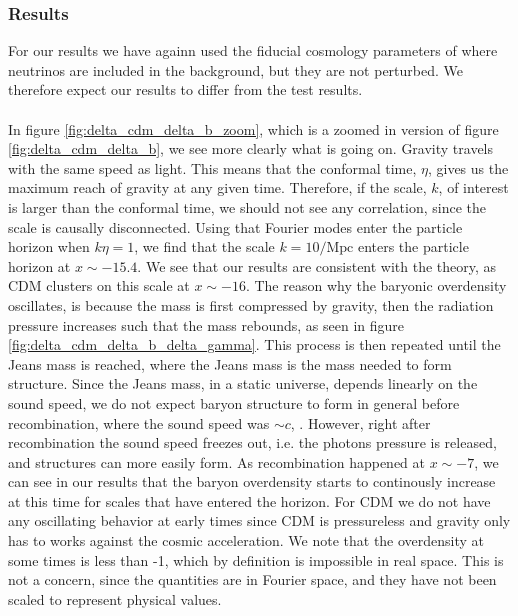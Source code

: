 \documentclass{aa}
\begin{document}
\subsubsection{Results}
For our results we have againn used the fiducial cosmology parameters of \cite{winther:2023} where neutrinos are included in the background, but they are not perturbed. We therefore expect our results to differ from the test results.\\
\\
In figure \ref{fig:delta_cdm_delta_b_zoom}, which is a zoomed in version of figure \ref{fig:delta_cdm_delta_b}, we see more clearly what is going on. Gravity travels with the same speed as light. This means that the conformal time, $\eta$,
gives us the maximum reach of gravity at any given time. Therefore, if the scale, $k$, of interest is larger than the conformal time, we should not see any correlation,
since the scale is causally disconnected. Using that Fourier modes enter the particle horizon when $k\eta=1$, we find
that the scale $k=10/\mathrm{Mpc}$ enters the particle horizon at $x\sim -15.4$.
We see that our results are consistent with the theory, as CDM clusters on this scale at $x\sim -16$. The reason why the baryonic overdensity oscillates, is because 
the mass is first compressed by gravity, then the radiation pressure increases such that the mass rebounds, as seen in figure \ref{fig:delta_cdm_delta_b_delta_gamma}. This process is then repeated until the Jeans mass is reached, where the Jeans mass is the mass needed to form structure.
Since the Jeans mass, in a static universe, depends linearly on the sound speed, we do not expect baryon structure to form in general before recombination, where the sound speed was $\sim c$, \cite{Shen:2022}. However, right after recombination  
the sound speed freezes out, i.e. the photons pressure is released, and structures can more easily form. As recombination happened at $x\sim -7$, we can see in our results that the baryon overdensity starts to continously increase at this time for scales that have entered the horizon.
For CDM we do not have any oscillating behavior at early times since CDM is pressureless and gravity only has to works against the cosmic acceleration.   
We note that the overdensity at some times is less than -1, which by definition is impossible in real space. This is not a concern, since the quantities are in Fourier space, and they have not been scaled to represent physical values. 
\end{document}
